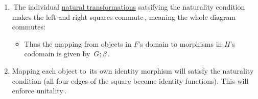 \begin{enumerate}
    \item  \,The individual \href{doc/1 math/Seven Sketches in Compositionality/Chapter 3: Databases/3 Functors, natural transformations, and databases/4 Natural transformations/1 Natural transformation}{natural transformations} satsifying the naturality condition makes the left and right squares commute\,, meaning the whole diagram commutes: 
          \begin{itemize}
            \item Thus the mapping from objects in $F$'s domain to morphisms in $H$'s codomain is given by \,$G;\beta$\,.
          \end{itemize}
    \item Mapping each object to \,its own identity morphism will satisfy the naturality condition (all four edges of the square become identity functions). This will enforce unitality\,.
  \end{enumerate}
